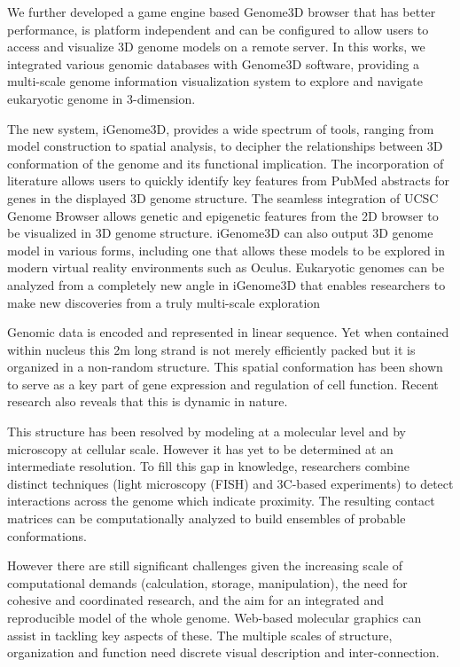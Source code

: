 \documentclass[a4paper]{article}
\begin{document}
We further developed a game engine based Genome3D
browser that has better performance, is platform independent and can be
configured to allow users to access and visualize 3D genome models on a
remote server. In this works, we integrated various genomic databases with
Genome3D software, providing a multi-scale genome information
visualization system to explore and navigate eukaryotic genome in
3-dimension.  

The new system, iGenome3D, provides a wide spectrum of
tools, ranging from model construction to spatial analysis, to decipher
the relationships between 3D conformation of the genome and its functional
implication.  The incorporation of literature allows users to quickly
identify key features from PubMed abstracts for genes in the displayed 3D
genome structure.  The seamless integration of UCSC Genome Browser allows
genetic and epigenetic features from the 2D browser to be visualized in 3D
genome structure. iGenome3D can also output 3D genome model in various
forms, including one that allows these models to be explored in modern
virtual reality environments such as Oculus.  Eukaryotic genomes can be
analyzed from a completely new angle in iGenome3D that enables researchers
to make new discoveries from a truly multi-scale exploration




Genomic data is encoded and represented in linear sequence. Yet when contained within nucleus this 2m long strand is not merely efficiently packed but it is organized in a non-random structure. This spatial conformation has been shown to serve as a key part of gene expression and regulation of cell function. Recent research also reveals that this is dynamic in nature.

This structure has been resolved by modeling at a molecular level and by microscopy at cellular scale. However it has yet to be determined at an intermediate resolution. To fill this gap in knowledge, researchers combine distinct techniques (light microscopy (FISH) and 3C-based experiments) to detect interactions across the genome which indicate proximity. The resulting contact matrices can be computationally analyzed to build ensembles of probable conformations.

However there are still significant challenges given the increasing scale of computational demands (calculation, storage, manipulation), the need for cohesive and coordinated research, and the aim for an integrated and reproducible model of the whole genome. Web-based molecular graphics can assist in tackling key aspects of these. The multiple scales of structure, organization and function need discrete visual description and inter-connection.
\end{document}
